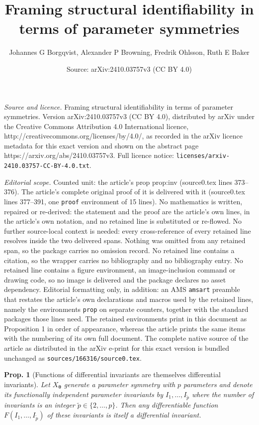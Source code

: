 \documentclass[10pt,a4paper]{amsart}
\title{Framing structural identifiability in terms of parameter symmetries}
\author{Johannes G Borgqvist, Alexander P Browning, Fredrik Ohlsson, Ruth E Baker}
\date{Source: arXiv:2410.03757v3 (CC BY 4.0)}
\newtheorem{prop}{Prop.}
\begin{document}
\maketitle

\noindent\emph{Source and licence.} Framing structural identifiability in terms of parameter symmetries. Version arXiv:2410.03757v3 (CC BY 4.0), distributed by arXiv under the Creative Commons Attribution 4.0 International licence, http://creativecommons.org/licenses/by/4.0/, as recorded in the arXiv licence metadata for this exact version and shown on the abstract page https://arxiv.org/abs/2410.03757v3. Full licence notice: \texttt{licenses/arxiv-2410.03757-CC-BY-4.0.txt}.\par\smallskip

\noindent\textit{Editorial scope.} Counted unit: the article's prop prop:inv (source0.tex lines 373--376). The article's complete original proof of it is delivered with it (source0.tex lines 377--391, one \texttt{proof} environment of 15 lines). No mathematics is written, repaired or re-derived: the statement and the proof are the article's own lines, in the article's own notation, and no retained line is substituted or re-flowed.  No further source-local context is needed: every cross-reference of every retained line resolves inside the two delivered spans.  Nothing was omitted from any retained span, so the package carries no omission record.  No retained line contains a citation, so the wrapper carries no bibliography and no bibliography entry.  No retained line contains a figure environment, an image-inclusion command or drawing code, so no image is delivered and the package declares no asset dependency.  Editorial formatting only, in addition: an AMS \texttt{amsart} preamble that restates the article's own declarations and macros used by the retained lines, namely the environments \texttt{prop} on separate counters, together with the standard packages those lines need.  The retained environments print in this document as Proposition 1 in order of appearance, whereas the article prints the same items with the numbering of its own full document.  The complete native source of the article as distributed in the arXiv e-print for this exact version is bundled unchanged as \texttt{sources/166316/source0.tex}.
\begin{prop}[Functions of differential invariants are themselves differential invariants]
Let $X_{\boldsymbol{\theta}}$ generate a parameter symmetry with $p$ parameters and denote its functionally independent parameter invariants by $I_{1},\ldots,I_{\tilde{p}}$ where the number of invariants is an integer $\tilde{p}\in\{2,\ldots,p\}$. Then any differentiable function $F\left(I_{1},\ldots,I_{\tilde{p}}\right)$ of these invariants is itself a differential invariant.
\label{prop:inv}
\end{prop}
\end{document}
